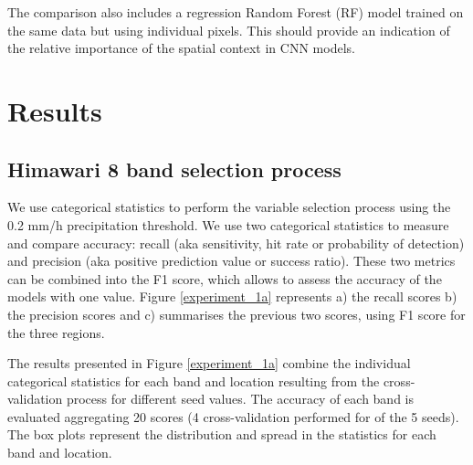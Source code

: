 \documentclass[3p,times]{elsarticle}
\begin{document}
The comparison also includes a regression Random Forest (RF) model \citep{breiman2001random} trained on the same data but using individual pixels. This should provide an indication of the relative importance of the spatial context in CNN models.


\section{Results}

\subsection{Himawari 8 band selection process}

We use categorical statistics to perform the variable selection process using the 0.2 mm/h precipitation threshold. We use two categorical statistics to measure and compare accuracy: recall (aka sensitivity, hit rate or probability of detection) and precision (aka positive prediction value or success ratio). These two metrics can be combined into the F1 score, which allows to assess the accuracy of the models with one value. Figure \ref{experiment_1a} represents a) the recall scores b) the precision scores and c) summarises the previous two scores, using F1 score for the three regions.

The results presented in Figure \ref{experiment_1a} combine the individual categorical statistics for each band and location resulting from the cross-validation process for different seed values. The accuracy of each band is evaluated aggregating 20 scores (4 cross-validation performed for of the 5 seeds). The box plots represent the distribution and spread in the statistics for each band and location. %
\end{document}
